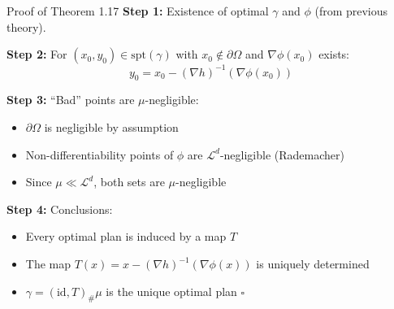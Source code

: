 \documentclass[aspectratio=169]{beamer}
\newcommand{\Ld}{\mathcal{L}^d}
\begin{document}
\begin{frame}{Proof of Theorem 1.17}
\textbf{Step 1:} Existence of optimal $\gamma$ and $\phi$ (from previous theory).

\vspace{0.2cm}
\textbf{Step 2:} For $(x_0, y_0) \in \text{spt}(\gamma)$ with $x_0 \notin \partial\Omega$ and $\nabla\phi(x_0)$ exists:
\[
y_0 = x_0 - (\nabla h)^{-1}(\nabla\phi(x_0))
\]

\vspace{0.2cm}
\textbf{Step 3:} ``Bad'' points are $\mu$-negligible:
\begin{itemize}
    \item $\partial\Omega$ is negligible by assumption
    \item Non-differentiability points of $\phi$ are $\Ld$-negligible (Rademacher)
    \item Since $\mu \ll \Ld$, both sets are $\mu$-negligible
\end{itemize}

\vspace{0.2cm}
\textbf{Step 4:} Conclusions:
\begin{itemize}
    \item Every optimal plan is induced by a map $T$
    \item The map $T(x) = x - (\nabla h)^{-1}(\nabla\phi(x))$ is uniquely determined
    \item $\gamma = (\text{id}, T)_\# \mu$ is the unique optimal plan \hfill $\square$
\end{itemize}
\end{frame}
\end{document}
